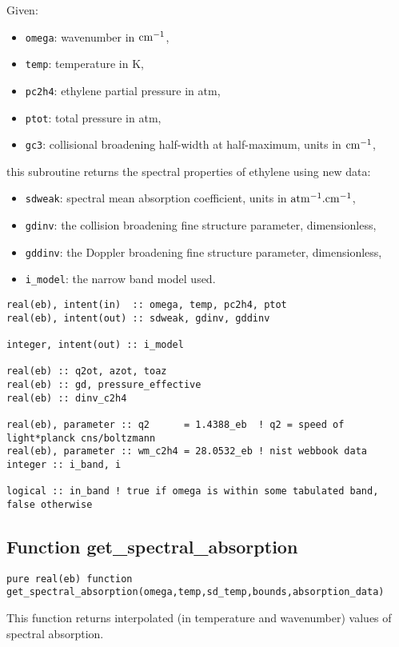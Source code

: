 Given:
\begin{itemize}
 \item \verb=omega=: wavenumber in $\rm cm^{-1}$,
 \item \verb=temp=: temperature in K,
 \item \verb=pc2h4=: ethylene partial pressure in atm,
 \item \verb=ptot=: total pressure in atm,
 \item \verb=gc3=: collisional broadening half-width at half-maximum, units in $\rm cm^{-1}$,
\end{itemize}
this subroutine returns the spectral properties of ethylene using new data:
\begin{itemize}
 \item \verb=sdweak=: spectral mean absorption coefficient, units in $\rm atm^{-1}.cm^{-1}$,
 \item \verb=gdinv=: the collision broadening fine structure parameter, dimensionless,
 \item \verb=gddinv=: the Doppler broadening fine structure parameter, dimensionless,
 \item \verb=i_model=: the narrow band model used.
\end{itemize}

\begin{lstlisting}
real(eb), intent(in)  :: omega, temp, pc2h4, ptot
real(eb), intent(out) :: sdweak, gdinv, gddinv

integer, intent(out) :: i_model

real(eb) :: q2ot, azot, toaz
real(eb) :: gd, pressure_effective
real(eb) :: dinv_c2h4

real(eb), parameter :: q2      = 1.4388_eb  ! q2 = speed of light*planck cns/boltzmann
real(eb), parameter :: wm_c2h4 = 28.0532_eb ! nist webbook data
integer :: i_band, i

logical :: in_band ! true if omega is within some tabulated band, false otherwise
\end{lstlisting}

\subsection{Function get\_spectral\_absorption}

\begin{lstlisting}
pure real(eb) function get_spectral_absorption(omega,temp,sd_temp,bounds,absorption_data)
\end{lstlisting}
This function returns interpolated (in temperature and wavenumber) values of spectral absorption.

